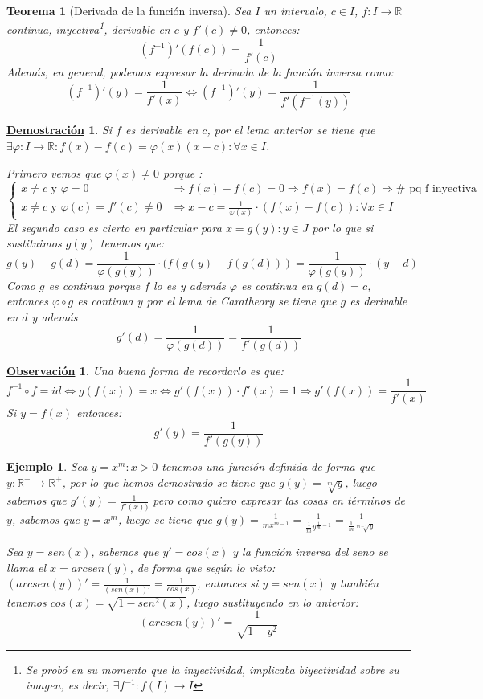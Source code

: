 \documentclass[10pt,a4paper,openright]{book}
\theoremstyle{break}
\newtheorem{theo}{Teorema}[chapter]
\newtheorem*{demo}{\underline{Demostración}}
\newtheorem{obs}{\underline{Observación}}[chapter]
\newtheorem{ej}{\underline{Ejemplo}}[chapter]
\begin{document}
\begin{theo}[Derivada de la función inversa]
Sea $I$ un intervalo, $c\in I$, $f:I\rightarrow \mathbb R$ continua, inyectiva\footnote{Se probó en su momento que la inyectividad, implicaba biyectividad sobre su imagen, es decir, $\exists f^{-1}: f(I)\rightarrow I$}, derivable en $c$ y $f'(c)\neq 0$, entonces:
$$(f^{-1})'(f(c))=\frac{1}{f'(c)}$$
Además, en general, podemos expresar la derivada de la función inversa como:
$$(f^{-1})'(y)=\frac{1}{f'(x)} \Leftrightarrow (f^{-1})'(y)=\frac{1}{f'(f^{-1}(y))}$$
\end{theo}
\begin{demo}
Si $f$ es derivable en $c$, por el lema anterior se tiene que $\exists \varphi: I \rightarrow\mathbb R: f(x)-f(c)=\varphi(x)(x-c): \forall x\in I$.

Primero vemos que $\varphi (x)\neq 0$ porque :
$$\begin{cases}x\neq c \mbox{ y } \varphi =0 & \Rightarrow f(x)-f(c)=0\Rightarrow f(x)=f(c)\Rightarrow \# \mbox{ pq f inyectiva}\\
x\neq c \mbox{ y } \varphi(c)= f'(c)\neq 0 &\Rightarrow x-c=\frac{1}{\varphi(x)}\cdot (f(x)-f(c)): \forall x\in I
\end{cases}$$
El segundo caso es cierto en particular para $x=g(y): y\in J$ por lo que si sustituimos $g(y)$ tenemos que:
$$g(y)-g(d)=\frac{1}{\varphi(g(y))}\cdot (f(g(y)-f(g(d)))=\frac{1}{\varphi(g(y))}\cdot (y-d)$$
Como $g$ es continua porque $f$ lo es y además $\varphi$ es continua en $g(d)=c$, entonces $\varphi\circ g$ es continua y por el lema de Caratheory se tiene que $g$ es derivable en $d$ y además
$$g'(d)=\frac{1}{\varphi(g(d))}=\frac{1}{f'(g(d))}$$
\end{demo}

\begin{obs}
Una buena forma de recordarlo es que:
$$f^{-1}\circ f = id \Leftrightarrow g(f(x))=x\Leftrightarrow g'(f(x))\cdot f'(x)=1\Rightarrow g'(f(x))=\frac{1}{f'(x)}$$
Si $y=f(x)$ entonces:
$$g'(y)=\frac{1}{f'(g(y))}$$
\end{obs}

\begin{ej}
Sea $y=x^m: x>0$ tenemos una función definida de forma que $y: \mathbb R^+ \rightarrow \mathbb R^+$, por lo que hemos demostrado se tiene que $g(y)=\sqrt[m]{y}$, luego sabemos que $g'(y)=\frac{1}{f'(x))}$ pero como quiero expresar las cosas en términos de $y$, sabemos que $y=x^m$, luego se tiene que $g(y)=\frac{1}{mx^{m-1}}=\frac{1}{\frac{1}{m}y^{\frac{1}{m}-1}}=\frac{1}{\frac{1}{m}\sqrt[m-1]{y}}$

Sea $y=sen(x)$, sabemos que $y'=cos(x)$ y la función inversa del seno se llama el $x=arcsen(y)$, de forma que según lo visto: $(arcsen(y))'=\frac{1}{(sen(x))'}=\frac{1}{cos(x)}$, entonces si $y=sen(x)$ y también tenemos $cos(x)=\sqrt{1-sen^2(x)}$, luego sustituyendo en lo anterior:
$$(arcsen(y))'=\frac{1}{\sqrt{1-y^2}}$$
\end{ej}
\end{document}
